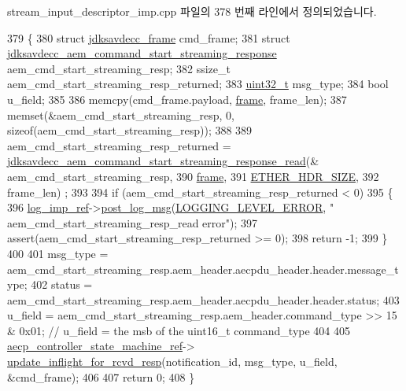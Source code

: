 stream\+\_\+input\+\_\+descriptor\+\_\+imp.\+cpp 파일의 378 번째 라인에서 정의되었습니다.


\begin{DoxyCode}
379 \{
380     \textcolor{keyword}{struct }\hyperlink{structjdksavdecc__frame}{jdksavdecc\_frame} cmd\_frame;
381     \textcolor{keyword}{struct }\hyperlink{structjdksavdecc__aem__command__start__streaming__response}{jdksavdecc\_aem\_command\_start\_streaming\_response} 
      aem\_cmd\_start\_streaming\_resp;
382     ssize\_t aem\_cmd\_start\_streaming\_resp\_returned;
383     \hyperlink{parse_8c_a6eb1e68cc391dd753bc8ce896dbb8315}{uint32\_t} msg\_type;
384     \textcolor{keywordtype}{bool} u\_field;
385 
386     memcpy(cmd\_frame.payload, \hyperlink{gst__avb__playbin_8c_ac8e710e0b5e994c0545d75d69868c6f0}{frame}, frame\_len);
387     memset(&aem\_cmd\_start\_streaming\_resp, 0, \textcolor{keyword}{sizeof}(aem\_cmd\_start\_streaming\_resp));
388 
389     aem\_cmd\_start\_streaming\_resp\_returned = 
      \hyperlink{group__command__start__streaming__response_ga7aaa67f690314dc70f6972a98f5e23f7}{jdksavdecc\_aem\_command\_start\_streaming\_response\_read}(&
      aem\_cmd\_start\_streaming\_resp,
390                                                                                                  
      \hyperlink{gst__avb__playbin_8c_ac8e710e0b5e994c0545d75d69868c6f0}{frame},
391                                                                                                  
      \hyperlink{namespaceavdecc__lib_a6c827b1a0d973e18119c5e3da518e65ca9512ad9b34302ba7048d88197e0a2dc0}{ETHER\_HDR\_SIZE},
392                                                                                                  frame\_len)
      ;
393 
394     \textcolor{keywordflow}{if} (aem\_cmd\_start\_streaming\_resp\_returned < 0)
395     \{
396         \hyperlink{namespaceavdecc__lib_acbe3e2a96ae6524943ca532c87a28529}{log\_imp\_ref}->\hyperlink{classavdecc__lib_1_1log_a68139a6297697e4ccebf36ccfd02e44a}{post\_log\_msg}(\hyperlink{namespaceavdecc__lib_a501055c431e6872ef46f252ad13f85cdaf2c4481208273451a6f5c7bb9770ec8a}{LOGGING\_LEVEL\_ERROR}, \textcolor{stringliteral}{"
      aem\_cmd\_start\_streaming\_resp\_read error"});
397         assert(aem\_cmd\_start\_streaming\_resp\_returned >= 0);
398         \textcolor{keywordflow}{return} -1;
399     \}
400 
401     msg\_type = aem\_cmd\_start\_streaming\_resp.aem\_header.aecpdu\_header.header.message\_type;
402     status = aem\_cmd\_start\_streaming\_resp.aem\_header.aecpdu\_header.header.status;
403     u\_field = aem\_cmd\_start\_streaming\_resp.aem\_header.command\_type >> 15 & 0x01; \textcolor{comment}{// u\_field = the msb of
       the uint16\_t command\_type}
404 
405     \hyperlink{namespaceavdecc__lib_a0b1b5aea3c0490f77cbfd9178af5be22}{aecp\_controller\_state\_machine\_ref}->
      \hyperlink{classavdecc__lib_1_1aecp__controller__state__machine_a997abd9786c330a5505e903e6443208e}{update\_inflight\_for\_rcvd\_resp}(notification\_id, msg\_type, u\_field, &cmd\_frame);
406 
407     \textcolor{keywordflow}{return} 0;
408 \}
\end{DoxyCode}


